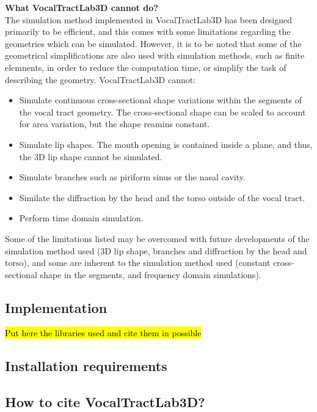 \documentclass[]{article}
\begin{document}
	\textbf{What VocalTractLab3D cannot do?} \\
	The simulation method implemented in VocalTractLab3D has been 
	designed primarily to be efficient, and this comes with some 
	limitations regarding the geometries which can be simulated.
	However, it is to be noted that some of the geometrical simplifications are also used with simulation methods, such as finite
	elemnents, in order to reduce the computation time, or simplify the task of describing the geometry.
	VocalTractLab3D cannot:
	\begin{itemize}
		\item Simulate continuous cross-sectional shape variations within the segments of the vocal tract geometry. The cross-sectional shape can be scaled to account for area variation, but the shape reamins constant.
		\item Simulate lip shapes. The mouth opening is contained 
		inside a plane, and thus, the 3D lip shape cannot be simulated.
		\item Simulate branches such as piriform sinus or the nasal 
		cavity.
		\item Similate the diffraction by the head and the torso outside
		of the vocal tract.
		\item Perform time domain simulation.
	\end{itemize}
	Some of the limitations listed may be overcomed with future developments of the simulation method used (3D lip shape, branches 
	and diffraction by the head and torso), and some are inherent to 
	the simulation method used (constant cross-sectional shape in the 
	segments, and frequency domain simulations).
	
	\subsection{Implementation}
	
	\hl{Put here the libraries used and cite them in possible}
	
	\subsection{Installation requirements}
	
	\subsection{How to cite VocalTractLab3D?}
	
	
\end{document}
